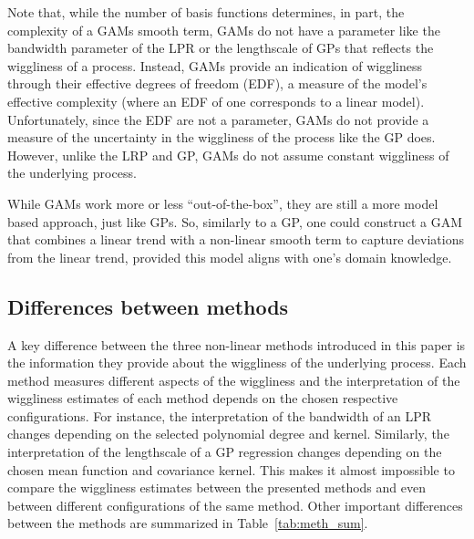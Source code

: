 \documentclass[man, floatsintext]{apa7}
\begin{document}
Note that, while the number of basis functions determines, in part, the
complexity of a GAMs smooth term, GAMs do not have a parameter like the
bandwidth parameter of the LPR or the lengthscale of GPs that reflects the
wiggliness of a process. Instead, GAMs provide an indication of wiggliness
through their effective degrees of freedom (EDF), a measure of the model's
effective complexity (where an EDF of one corresponds to a linear model).
Unfortunately, since the EDF are not a parameter, GAMs do not provide a measure
of the uncertainty in the wiggliness of the process like the GP does. However,
unlike the LRP and GP, GAMs do not assume constant wiggliness of the underlying
process.

While GAMs work more or less “out-of-the-box”, they are still a more model
based approach, just like GPs. So, similarly to a GP, one could construct a GAM
that combines a linear trend with a non-linear smooth term to capture
deviations from the linear trend, provided this model aligns with one's domain
knowledge.

\subsection{Differences between methods}

A key difference between the three non-linear methods introduced in this paper
is the information they provide about the wiggliness of the underlying process.
Each method measures different aspects of the wiggliness and the interpretation
of the wiggliness estimates of each method depends on the chosen respective
configurations. For instance, the interpretation of the bandwidth of an LPR
changes depending on the selected polynomial degree and kernel. Similarly, the
interpretation of the lengthscale of a GP regression changes depending on the
chosen mean function and covariance kernel. This makes it almost impossible to
compare the wiggliness estimates between the presented methods and even between
different configurations of the same method. Other important differences
between the methods are summarized in Table~\ref{tab:meth_sum}.
\end{document}
